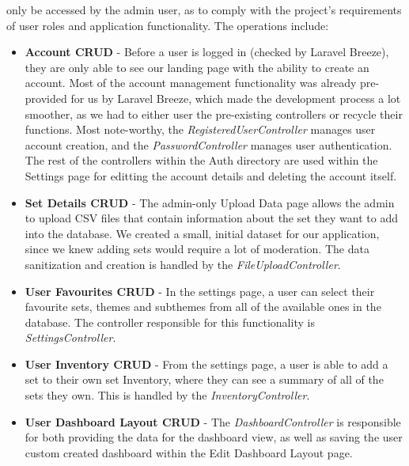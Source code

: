only be accessed by the admin user, as to comply with the project's requirements of user roles and application functionality. The operations include:
\begin{itemize}
    \item \textbf{Account CRUD} - Before a user is logged in (checked by Laravel Breeze), they are only able to see our landing page with the ability to create an account.
    Most of the account management functionality was already pre-provided for us by Laravel Breeze, which made the development process a lot smoother,
    as we had to either user the pre-existing controllers or recycle their functions. Most note-worthy, the \textit{RegisteredUserController} manages user account creation,
    and the \textit{PasswordController} manages user authentication. The rest of the controllers within the Auth directory are used within the Settings page
    for editting the account details and deleting the account itself.
    \item \textbf{Set Details CRUD} - The admin-only Upload Data page allows the admin to upload CSV files that contain information about the set they want
    to add into the database. We created a small, initial dataset for our application, since we knew adding sets would require a lot of moderation. The data
    sanitization and creation is handled by the \textit{FileUploadController}.
    \item \textbf{User Favourites CRUD} - In the settings page, a user can select their favourite sets, themes and subthemes from all of the available ones
    in the database. The controller responsible for this functionality is \textit{SettingsController}.
    \item \textbf{User Inventory CRUD} - From the settings page, a user is able to add a set to their own set Inventory, where they can see a summary
    of all of the sets they own. This is handled by the \textit{InventoryController}.
    \item \textbf{User Dashboard Layout CRUD} - The \textit{DashboardController} is responsible for both providing the data for the dashboard view, as well
    as saving the user custom created dashboard within the Edit Dashboard Layout page.
\end{itemize}